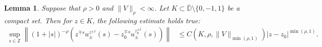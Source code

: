 \documentclass[12pt,oneside,onecolumn,open]{article}
\newtheorem{lema}[teo]{Lemma}
\begin{document}
\begin{lema}\label{y10}
  Suppose that $\rho > 0 $ and $ \|  V\|_{\rho} < \infty $.  
  Let $K \subset \overline{ \mathbb{D}} \setminus  \{0, -1,  1\} $ be a compact set. %
  Then for  $z \in K$, the following estimate holds true:
    \begin{align}\label{z}
        \sup_{s \in \mathbb{Z}} \left\| (1+|s|)^{-\rho } \left( z^{\mp s} u_{\pm}^{z^{\pm 1}}(s) - z_{0}^{\mp s} u_{\pm}^{z_{0}^{\pm 1}}(s) \right) \right\| &\leq C(K, \rho, \|  V\| _{\min(\rho, 1 )})  |z - z_0|^{\min(\rho, 1)}.
        \end{align}
\end{lema}
\end{document}
